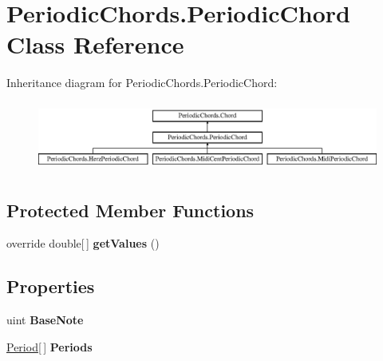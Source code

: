 \hypertarget{class_periodic_chords_1_1_periodic_chord}{\section{Periodic\+Chords.\+Periodic\+Chord Class Reference}
\label{class_periodic_chords_1_1_periodic_chord}
}
Inheritance diagram for Periodic\+Chords.\+Periodic\+Chord\+:\begin{figure}[H]
\begin{center}
\leavevmode
\includegraphics[height=2.295082cm]{class_periodic_chords_1_1_periodic_chord}
\end{center}
\end{figure}
\subsection*{Protected Member Functions}
\begin{DoxyCompactItemize}
\item 
\hypertarget{class_periodic_chords_1_1_periodic_chord_a6a0af17872bad7e2f59759b6f041dfe2}{override double\mbox{[}$\,$\mbox{]} {\bfseries get\+Values} ()}\label{class_periodic_chords_1_1_periodic_chord_a6a0af17872bad7e2f59759b6f041dfe2}

\end{DoxyCompactItemize}
\subsection*{Properties}
\begin{DoxyCompactItemize}
\item 
\hypertarget{class_periodic_chords_1_1_periodic_chord_aa3e10ced590f148788c4ba40878e35cc}{uint {\bfseries Base\+Note}}\label{class_periodic_chords_1_1_periodic_chord_aa3e10ced590f148788c4ba40878e35cc}

\item 
\hypertarget{class_periodic_chords_1_1_periodic_chord_aaf74837a4f47ffe44b42d38071664c09}{\hyperlink{class_periodic_chords_1_1_period}{Period}\mbox{[}$\,$\mbox{]} {\bfseries Periods}}\label{class_periodic_chords_1_1_periodic_chord_aaf74837a4f47ffe44b42d38071664c09}

\end{DoxyCompactItemize}
